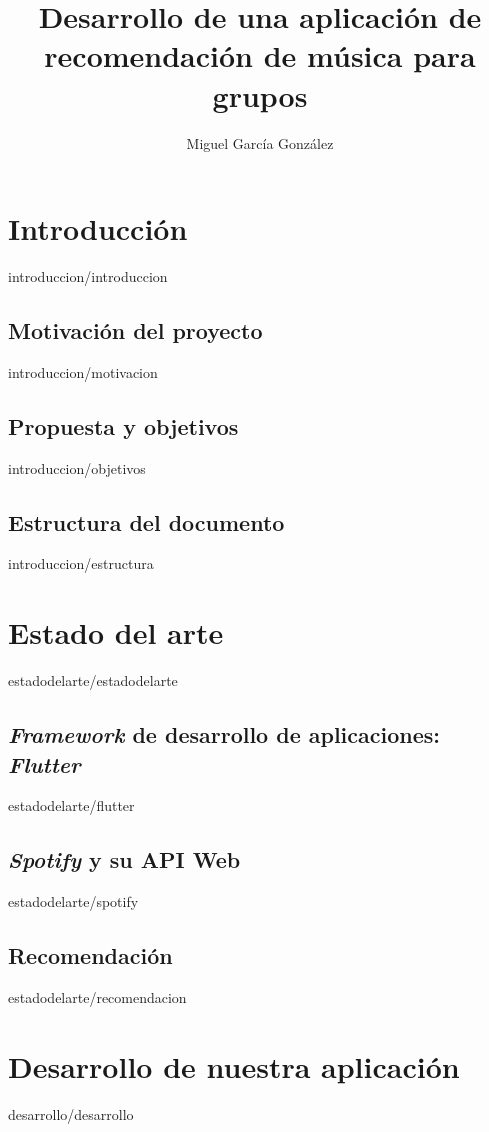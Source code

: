 \documentclass[epsbased,copyright,final,printable,covers,extendedindex,firstnumbered,tfm,gnuplot]{tfgtfmthesisuam}
\title{Desarrollo de una aplicación de recomendación de música para grupos}
\subtitle{}
\author{Miguel García González}
\begin{document}

\chapter{Introducción\label{CAP:INTRODUCCION}}{introduccion/introduccion}
  \section{Motivación del proyecto\label{SEC:MOTIVACION}}{introduccion/motivacion}
  \section{Propuesta y objetivos\label{SEC:OBJETIVOS}}{introduccion/objetivos}
  \section{Estructura del documento\label{SEC:ESTRUCTURA}}{introduccion/estructura}


\chapter{Estado del arte\label{CAP:ESTADODELARTE}}{estadodelarte/estadodelarte}
  \section{\textit{Framework} de desarrollo de aplicaciones: \textit{Flutter}\label{SEC:FLUTTER}}{estadodelarte/flutter}
  \section{\textit{Spotify} y su API Web\label{SEC:API_SPOTIFY}}{estadodelarte/spotify}
  \section{Recomendación\label{SEC:RECOMENDACION}}{estadodelarte/recomendacion}

\chapter{Desarrollo de nuestra aplicación\label{CAP:DESARROLLO}}{desarrollo/desarrollo}
\end{document}
